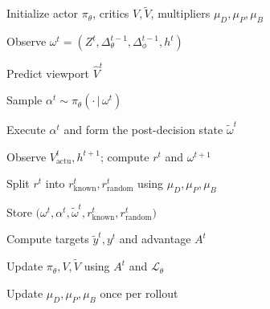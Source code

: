 \documentclass[10pt,conference,a4paper]{IEEEtran}
\begin{document}
\begin{algorithm}[H]
\caption{PPO + Post-Decision State Algorithm}
\label{alg:pds}

\small

\begin{algorithmic}[1]
\setlength{\itemsep}{1pt}

\State Initialize actor $\pi_\theta$, critics $V,\widetilde V$,
multipliers $\mu_D,\mu_P,\mu_B$

\Statex \vspace{2pt}



        \State Observe
        $\omega^t=(Z^t,\Delta_\theta^{t-1},
        \Delta_\phi^{t-1},h^t)$

        \State Predict viewport $\widehat V^t$

        \State Sample $\alpha^t\sim\pi_\theta(\cdot\,|\,\omega^t)$

        \State Execute $\alpha^t$ and form the post-decision
        state $\widetilde\omega^t$

        \State Observe $V_{\mathrm{actu}}^t,h^{t+1}$; compute
        $r^t$ and $\omega^{t+1}$

        \State Split $r^t$ into $r_{\mathrm{known}}^t,
        r_{\mathrm{random}}^t$ using $\mu_D,\mu_P,\mu_B$

        \State Store $\big(\omega^t,\alpha^t,\widetilde\omega^t,
        r_{\mathrm{known}}^t,r_{\mathrm{random}}^t\big)$

    \EndFor

    \Statex \vspace{2pt}


        \State Compute targets $\widetilde y^t,y^t$ and
        advantage $A^t$

    \EndFor

    \State Update $\pi_\theta,V,\widetilde V$ using $A^t$ and
    $\mathcal L_\theta$

    \State Update $\mu_D,\mu_P,\mu_B$ once per rollout

\EndFor

\end{algorithmic}
\end{algorithm}

\end{document}
